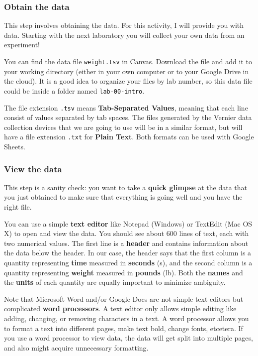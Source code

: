 \subsubsection{Obtain the data}
%
This step involves obtaining the data. For this activity, I will provide you with data. Starting with the next laboratory you will collect your own data from an experiment!

You can find the data file \texttt{weight.tsv} in Canvas. Download the file and add it to your working directory (either in your own computer or to your Google Drive in the cloud). It is a good idea to organize your files by lab number, so this data file could be inside a folder named \texttt{lab-00-intro}.

The file extension \texttt{.tsv} means \textbf{Tab-Separated Values}, meaning that each line consist of values separated by tab spaces. The files generated by the Vernier data collection devices that we are going to use will be in a similar format, but will have a file extension \texttt{.txt} for \textbf{Plain Text}. Both formats can be used with Google Sheets.
%
\subsubsection{View the data}
%
This step is a sanity check: you want to take a \textbf{quick glimpse} at the data that you just obtained to make sure that everything is going well and you have the right file.

You can use a simple \textbf{text editor} like Notepad (Windows) or TextEdit (Mac OS X) to open and view the data. You should see about 600 lines of text, each with two numerical values. The first line is a \textbf{header} and contains information about the data below the header. In our case, the header says that the first column is a quantity representing \textbf{time} measured in \textbf{seconds} (s), and the second column is a quantity representing \textbf{weight} measured in \textbf{pounds} (lb). Both the \textbf{names} and the \textbf{units} of each quantity are equally important to minimize ambiguity.

Note that Microsoft Word and/or Google Docs are not simple text editors but complicated \textbf{word processors}. A text editor only allows simple editing like adding, changing, or removing characters in a text. A word processor allows you to format a text into different pages, make text bold, change fonts, etcetera. If you use a word processor to view data, the data will get split into multiple pages, and also might acquire unnecessary formatting.

